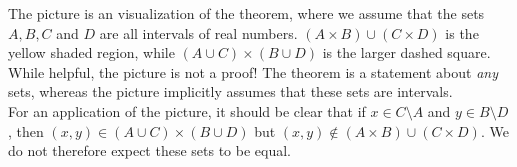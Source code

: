 The picture is an visualization of the theorem, where we assume that the sets $A,B,C$ and $D$ are all intervals of real numbers. $(A\times B)\cup(C\times D)$ is the yellow shaded region, while $(A\cup C)\times(B\cup D)$ is the larger dashed square. While helpful, the picture is not a proof! The theorem is a statement about \emph{any} sets, whereas the picture implicitly assumes that these sets are intervals.\\
For an application of the picture, it should be clear that if $x\in C\setminus A$ and $y\in B\setminus D$, then $(x,y)\in (A\cup C)\times (B\cup D)$ but $(x,y)\not\in (A\times B)\cup(C\times D)$. We do not therefore expect these sets to be equal.

% 


